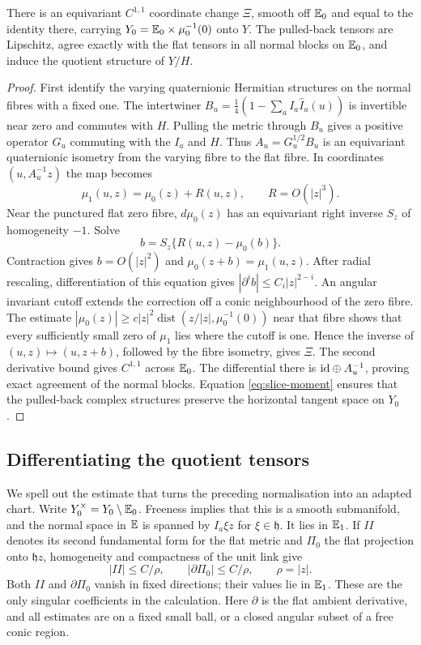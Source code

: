 \begin{lemma}\label{lem:normalise}
There is an equivariant $C^{1,1}$ coordinate change $\Xi$, smooth
off $\mathbb E_0$ and equal to the identity there, carrying
$Y_0=\mathbb E_0\times\mu_0^{-1}(0)$ onto $Y$. The pulled-back
tensors are Lipschitz, agree exactly with the flat tensors in all
normal blocks on $\mathbb E_0$, and induce the quotient structure of
$Y/H$.
\end{lemma}
\begin{proof}
First identify the varying quaternionic Hermitian structures on
the normal fibres with a fixed one. The intertwiner
$B_u=\tfrac14(1-\sum_aI_a\widehat I_a(u))$ is invertible near
zero and commutes with $H$. Pulling the metric through $B_u$
gives a positive operator $G_u$ commuting with the $I_a$ and $H$.
Thus $A_u=G_u^{1/2}B_u$ is an equivariant quaternionic isometry
from the varying fibre to the flat fibre. In coordinates
$(u,A_u^{-1}z)$ the map becomes
\[
 \mu_1(u,z)=\mu_0(z)+R(u,z),\qquad R=O(|z|^3).
\]
Near the punctured flat zero fibre, $d\mu_0(z)$ has an equivariant
right inverse $S_z$ of homogeneity $-1$. Solve
\[
 b=S_z\{R(u,z)-\mu_0(b)\}.
\]
Contraction gives $b=O(|z|^2)$ and
$\mu_0(z+b)=\mu_1(u,z)$. After radial rescaling, differentiation
of this equation gives $|\partial^i b|\le C_i|z|^{2-i}$.
An angular invariant cutoff extends the correction off a conic
neighbourhood of the zero fibre. The estimate
$|\mu_0(z)|\ge c|z|^2\operatorname{dist}(z/|z|,\mu_0^{-1}(0))$
near that fibre shows that every sufficiently small zero of
$\mu_1$ lies where the cutoff is one. Hence the inverse of
$(u,z)\mapsto(u,z+b)$, followed by the fibre isometry, gives
$\Xi$. The second derivative bound gives $C^{1,1}$ across
$\mathbb E_0$. The differential there is
$\mathrm{id}\oplus A_u^{-1}$, proving exact agreement of the normal
blocks. Equation \eqref{eq:slice-moment} ensures that the pulled-back
complex structures preserve the horizontal tangent space on $Y_0$.
\end{proof}

\subsection{Differentiating the quotient tensors}
We spell out the estimate that turns the preceding normalisation
into an adapted chart. Write $Y_0^\times=Y_0\setminus\mathbb E_0$.
Freeness implies that this is a smooth submanifold, and the normal
space in $\mathbb E$ is spanned by $I_a\xi z$ for $\xi\in\mathfrak h$.
It lies in $\mathbb E_1$. If $II$ denotes its second fundamental form
for the flat metric and $\Pi_0$ the flat projection onto
$\mathfrak hz$, homogeneity and compactness of the unit link give
\begin{equation}\label{eq:singular-derivatives}
 |II|\le C/\rho,\qquad |\partial\Pi_0|\le C/\rho,
 \qquad \rho=|z|.
\end{equation}
Both $II$ and $\partial\Pi_0$ vanish in fixed directions;
their values lie in $\mathbb E_1$. These are the only singular
coefficients in the calculation. Here $\partial$ is the flat
ambient derivative, and all estimates are on a fixed small ball,
or a closed angular subset of a free conic region.

